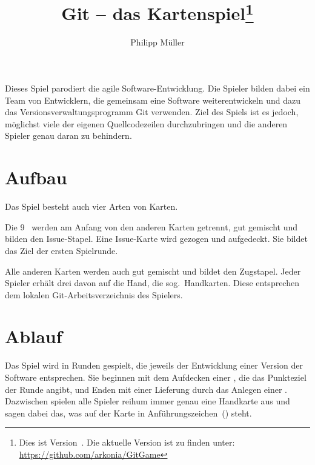 \documentclass[DIV=15, fontsize=11pt]{gitgame}
\title{Git -- das Kartenspiel\footnote{Dies ist Version~\gitgameversion. Die aktuelle Version ist zu finden unter: \url{https://github.com/arkonia/GitGame}}}
\author{Philipp Müller}
\begin{document}
\maketitle

Dieses Spiel parodiert die agile Software-Entwicklung. Die Spieler bilden dabei ein Team von Entwicklern, die gemeinsam eine Software weiterentwickeln und dazu das Versionsverwaltungsprogramm Git verwenden. Ziel des Spiels ist es jedoch, möglichst viele der eigenen Quellcodezeilen durchzubringen und die anderen Spieler genau daran zu behindern.



\section{Aufbau}
Das Spiel besteht auch vier Arten von Karten.


Die 9~ werden am Anfang von den anderen Karten getrennt, gut gemischt und bilden den Issue-Stapel. Eine Issue-Karte wird gezogen und aufgedeckt. Sie bildet das Ziel der ersten Spielrunde.

Alle anderen Karten werden auch gut gemischt und bildet den Zugstapel. Jeder Spieler erhält drei davon auf die Hand, die sog.\ Handkarten. Diese entsprechen dem lokalen Git-Arbeitsverzeichnis des Spielers.



\section{Ablauf}
Das Spiel wird in Runden gespielt, die jeweils der Entwicklung einer Version der Software entsprechen. Sie beginnen mit dem Aufdecken einer , die das Punkteziel der Runde angibt, und Enden mit einer Lieferung durch das Anlegen einer . Dazwischen spielen alle Spieler reihum immer genau eine Handkarte aus und sagen dabei das, was auf der Karte in Anführungszeichen~() steht.
\end{document}
